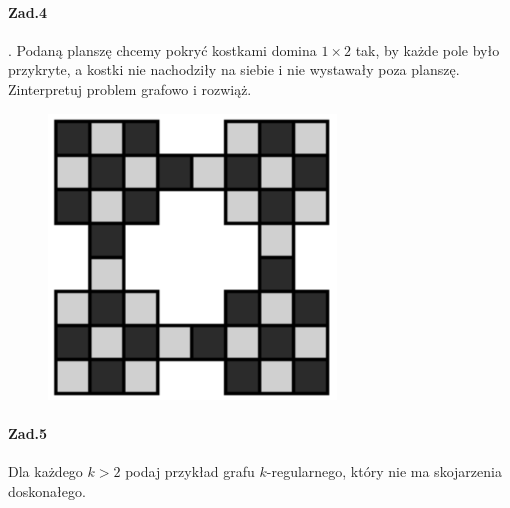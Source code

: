 \paragraph{Zad.4}. Podaną planszę chcemy pokryć kostkami domina $1 \times 2$ tak, by każde pole było przykryte, a kostki nie nachodziły na siebie i nie wystawały poza planszę. Zinterpretuj problem grafowo i rozwiąż.
\begin{figure}[H]
\centering
\includegraphics[width=.6\textwidth]{img/2_zad_4}
\end{figure}

\paragraph{Zad.5} Dla każdego $k > 2$ podaj przykład grafu $k$-regularnego, który nie ma skojarzenia doskonałego.

